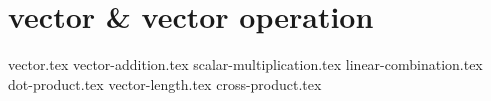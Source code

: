 \chapter{vector \& vector operation}
{vector.tex}
{vector-addition.tex}
{scalar-multiplication.tex}
{linear-combination.tex}
{dot-product.tex}
{vector-length.tex}
{cross-product.tex}